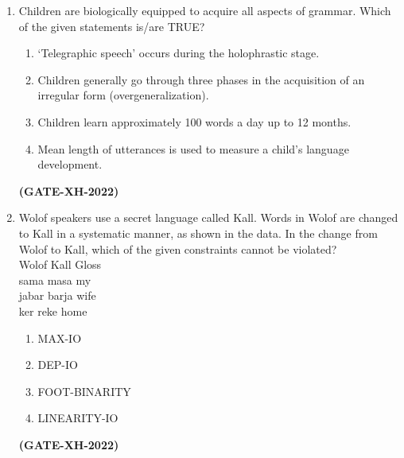 \documentclass[journal]{IEEEtran}
\begin{document}
\begin{enumerate}
This book is readable.  
\begin{multicols}{2}
\begin{enumerate}
\item Sociolinguistic change  
\item Grammatical category change  
\item Semantic change  
\item Typological change  
\end{enumerate}
\end{multicols}
\hfill\textbf{(GATE-XH-2022)}

\item Children are biologically equipped to acquire all aspects of grammar. Which of the given statements is/are TRUE? 
\begin{enumerate}
\item ‘Telegraphic speech’ occurs during the holophrastic stage.  
\item Children generally go through three phases in the acquisition of an irregular form (overgeneralization).  
\item Children learn approximately 100 words a day up to 12 months.  
\item Mean length of utterances is used to measure a child’s language development.  
\end{enumerate}
\hfill\textbf{(GATE-XH-2022)}

\item Wolof speakers use a secret language called Kall. Words in Wolof are changed to Kall in a systematic manner, as shown in the data. In the change from Wolof to Kall, which of the given constraints cannot be violated?\\
    Wolof \hspace{1cm}  Kall \hspace{1cm}  Gloss\\
    sama \hspace{1cm}  masa \hspace{1cm}   my\\
    jabar\hspace{1.2cm} barja \hspace{1cm}  wife\\
    ker \hspace{1.3cm}  reke  \hspace{1cm} home
    
\begin{multicols}{2}
\begin{enumerate}
\item MAX-IO  
\item DEP-IO  
\item FOOT-BINARITY  
\item LINEARITY-IO  
\end{enumerate}
\end{multicols}
\hfill\textbf{(GATE-XH-2022)}


\end{enumerate}
\end{document}
